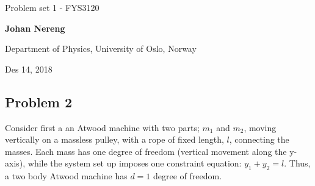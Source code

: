 \documentclass[%
oneside,                 %
final,                   %
10pt]{article}
\begin{document}

\newcommand{\exercisesection}[1]{\subsection*{#1}}






\thispagestyle{empty}

\begin{center}
{\LARGE\bf
\begin{spacing}{1.25}
Problem set 1 - FYS3120
\end{spacing}
}
\end{center}


\begin{center}
{\bf Johan Nereng}
\end{center}

    \begin{center}
\centerline{{\small Department of Physics, University of Oslo, Norway}}
\end{center}
    

\begin{center}
Des 14, 2018
\end{center}

\vspace{5cm}

\subsection{Problem 2}
Consider first a an Atwood machine with two parts; $m_1$ and $m_2$, moving vertically on a massless pulley, with a rope of fixed length, $l$, connecting the masses. Each mass has one degree of freedom (vertical movement along the y-axis), while the system set up imposes one constraint equation: $y_1+y_2=l$. Thus, a two body Atwood machine has $d=1$ degree of freedom. \par 
\end{document}

